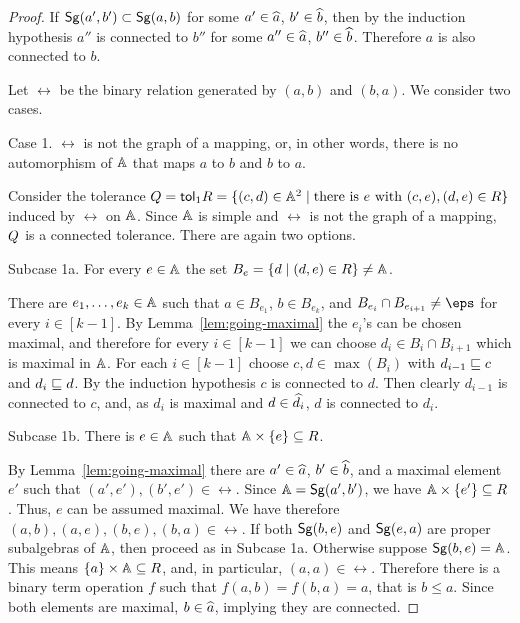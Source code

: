 \documentclass[11pt]{article}
\begin{document}
\begin{proof}
\smallskip

If ${\sf Sg}(a',b')\subset {\sf Sg}(a,b)$ for some $a'\in\widehat a$, $b'\in\widehat b$, then by the 
induction hypothesis $a''$ is connected to $b''$ for some $a''\in\widehat a$, $b''\in\widehat b$. 
Therefore $a$ is also connected to $b$.

\smallskip

Let $\rel$ be the binary relation generated by $(a,b)$ and $(b,a)$. We consider two cases.

\smallskip

{\sc Case 1.}
$\rel$ is not the graph of a mapping, or, in other words, there is no automorphism of ${\mathbb A}$ that 
maps $a$ to $b$ and $b$ to $a$.

\smallskip

Consider the tolerance $Q={\sf tol}_1R=\{(c,d)\in{\mathbb A}^2\mid \text{there is $e$ with } (c,e),(d,e)\in R\}
$ induced by $\rel$ on ${\mathbb A}$. Since ${\mathbb A}$ is simple and $\rel$ is not the graph of a mapping, $Q
$ is a connected  tolerance. There are again two options.

\smallskip

{\sc Subcase 1a.}
For every $e\in{\mathbb A}$ the set $B_e=\{d\mid (d,e)\in R\}\ne{\mathbb A}$.

\smallskip

There are $e _1,\ldots, e _{k}\in{\mathbb A}$ such that $a\in B_{e_1}$, $b\in B_{e_k}$, and 
$B_{e_i}\cap B_{e_{i+1}}\ne\eps$ for every $i\in[k-1]$. By 
Lemma~\ref{lem:going-maximal} the $e_i$'s can be chosen maximal, 
and therefore for every $i\in[k-1]$ we can choose $d_i\in B_i\cap B_{i+1}$ which is 
maximal in ${\mathbb A}$. For each $i\in[k-1]$ choose $c,d\in\max(B_i)$ with $d_{i-1}\sqsubseteq c$ 
and $d_i\sqsubseteq d$. By the induction hypothesis $c$ is connected to $d$. Then clearly 
$d_{i-1}$ is connected to $c$, and, as $d_i$ is maximal and $d\in\widehat{d_i}$, $d$ is 
connected to $d_i$.

\smallskip

{\sc Subcase 1b.}
There is $e\in{\mathbb A}$ such that ${\mathbb A}\times\{e\}\subseteq R$.

\smallskip

By Lemma~\ref{lem:going-maximal} there are $a'\in\widehat a$, $b'\in\widehat b$, and a maximal 
element $e'$ such that $(a',e'),(b',e')\in\rel$. Since ${\mathbb A}={\sf Sg}(a',b')$, we have 
${\mathbb A}\times\{e'\}\subseteq R$. Thus, $e$ can be assumed maximal. We have therefore 
$(a,b),(a,e),(b,e),(b,a)\in\rel$. If both ${\sf Sg}(b,e)$ and ${\sf Sg}(e,a)$ are proper 
subalgebras of ${\mathbb A}$, then proceed as in Subcase 1a. Otherwise suppose 
${\sf Sg}(b,e)={\mathbb A}$. This means $\{a\}\times{\mathbb A}\subseteq R$, and, in particular, $(a,a)\in\rel$. 
Therefore there is a binary term operation $f$ such that $f(a,b)=f(b,a)=a$, that 
is $b\le a$. Since both elements are maximal, $b\in\widehat a$, implying they are connected.


\end{proof}
\end{document}

